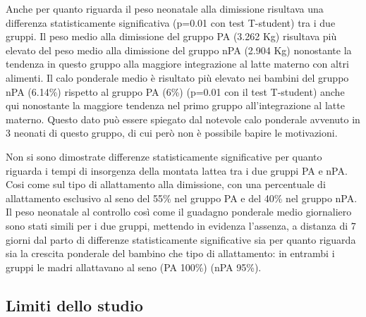 \documentclass[]{article}
\begin{document}
Anche per quanto riguarda il peso neonatale alla dimissione risultava
una differenza statisticamente significativa (p=0.01 con test T-student)
tra i due gruppi. Il peso medio alla dimissione del gruppo PA (3.262 Kg)
risultava più elevato del peso medio alla dimissione del gruppo nPA
(2.904 Kg) nonostante la tendenza in questo gruppo alla maggiore
integrazione al latte materno con altri alimenti. Il calo ponderale
medio è risultato più elevato nei bambini del gruppo nPA (6.14\%)
rispetto al gruppo PA (6\%) (p=0.01 con il test T-student) anche qui
nonostante la maggiore tendenza nel primo gruppo all'integrazione al
latte materno. Questo dato può essere spiegato dal notevole calo
ponderale avvenuto in 3 neonati di questo gruppo, di cui però non è
possibile bapire le motivazioni.

Non si sono dimostrate differenze statisticamente significative per
quanto riguarda i tempi di insorgenza della montata lattea tra i due
gruppi PA e nPA. Cosi come sul tipo di allattamento alla dimissione, con
una percentuale di allattamento esclusivo al seno del 55\% nel gruppo PA
e del 40\% nel gruppo nPA. Il peso neonatale al controllo così come il
guadagno ponderale medio giornaliero sono stati simili per i due gruppi,
mettendo in evidenza l'assenza, a distanza di 7 giorni dal parto di
differenze statisticamente significative sia per quanto riguarda sia la
crescita ponderale del bambino che tipo di allattamento: in entrambi i
gruppi le madri allattavano al seno (PA 100\%) (nPA 95\%).

\hypertarget{limiti-dello-studio}{%
\subsection{Limiti dello studio}\label{limiti-dello-studio}}
\end{document}
